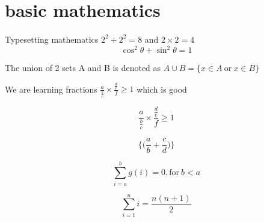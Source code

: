 \documentclass{article}
\begin{document}
	\section{basic mathematics}
	\paragraph{}
	Typesetting mathematics
	$2^{2} + 2^{2} = 8$ and $2 \times 2 = 4$
	\[ \cos^2 \theta + \sin^2 \theta = 1   \]
	
	The union of 2 sets A and B is denoted as
	$ A \cup B = \{ x \in A \ \text{or}  \ x \in B \} $
	
	We are learning fractions $ \frac{a}{ \frac{b}{c} } \times \frac{ \frac{d}{e} }{f} \geq 1 $ which is good
	
	\[ \frac{a}{ \frac{b}{c} } \times \frac{ \frac{d}{e} }{f} \geq 1
	\]
	
	\[ \Bigg\{ \bigg( \frac{a}{b} + \frac{c}{d} \bigg) \Bigg\} \]
	
	\[ \sum_{i=a}^{b}g(i) = 0, \text{for} \ b < a \]
	
	\[ \sum_{i=1}^{n} i =\frac{n(n+1)}{2} \]
\end{document}
